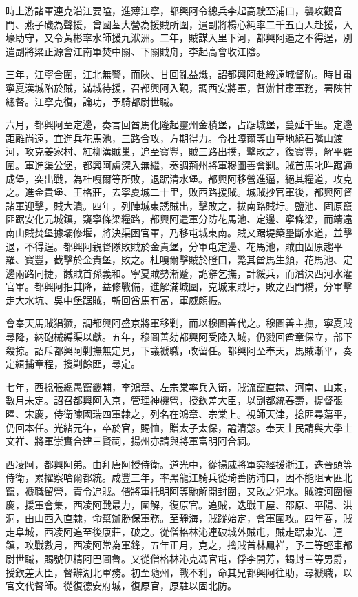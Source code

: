 \begin{pinyinscope}
時上游諸軍連克沿江要隘，進薄江寧，都興阿令總兵李起高駛至浦口，襲攻觀音門、燕子磯為聲援，曾國荃大營為援賊所圍，遣副將楊心純率二千五百人赴援，入壕助守，又令黃彬率水師援九洑洲。二年，賊謀入里下河，都興阿遏之不得逞，別遣副將梁正源會江南軍焚中關、下關賊舟，李起高會收江陰。

三年，江寧合圍，江北無警，而陜、甘回亂益熾，詔都興阿赴綏遠城督防。時甘肅寧夏漢城陷於賊，滿城待援，召都興阿入覲，調西安將軍，督辦甘肅軍務，署陜甘總督。江寧克復，論功，予騎都尉世職。

六月，都興阿至定邊，奏言回酋馬化隆起靈州金積堡，占踞城堡，蔓延千里。定邊距離尚遠，宜進兵花馬池，三路合攻，方期得力。令杜嘎爾等由草地繞石嘴山渡河，攻克姜家村、紅柳溝賊巢，追至寶豐，賊三路出撲，擊敗之，復寶豐，解平羅圍。軍進渠公堡，都興阿慮深入無繼，奏調荊州將軍穆圖善會剿。賊首馬叱吽踞通成堡，突出戰，為杜嘎爾等所敗，退踞清水堡。都興阿移營進逼，絕其糧道，攻克之。進金貴堡、王格莊，去寧夏城二十里，敗西路援賊。城賊抄官軍後，都興阿督諸軍迎擊，賊大潰。四年，列陣城東誘賊出，擊敗之，拔南路賊圩。鹽池、固原竄匪踞安化元城鎮，窺寧條梁糧路，都興阿遣軍分防花馬池、定邊、寧條梁，而靖遠南山賊焚堡據壩修堰，將決渠困官軍，乃移屯城東南。賊又踞堤築壘斷水道，並擊退，不得逞。都興阿親督隊敗賊於金貴堡，分軍屯定邊、花馬池，賊由固原趨平羅、寶豐，截擊於金貴堡，敗之。杜嘎爾擊賊於磴口，斃其酋馬生顏，花馬池、定邊兩路同捷，馘賊首孫義和。寧夏賊勢漸蹙，詭辭乞撫，計緩兵，而潛決西河水灌官軍。都興阿拒其降，益修戰備，進解滿城圍，克城東賊圩，敗之西門橋，分軍擊走大水坑、吳中堡踞賊，斬回酋馬有富，軍威頗振。

會奉天馬賊猖獗，調都興阿盛京將軍移剿，而以穆圖善代之。穆圖善主撫，寧夏賊尋降，納砲械縛渠以獻。五年，穆圖善劾都興阿受降入城，仍戮回酋章保立，部下殺掠。詔斥都興阿剿撫無定見，下議褫職，改留任。都興阿至奉天，馬賊漸平，奏定緝捕章程，搜剿餘匪，尋定。

七年，西捻張總愚竄畿輔，李鴻章、左宗棠率兵入衛，賊流竄直隸、河南、山東，數月未定。詔召都興阿入京，管理神機營，授欽差大臣，以副都統春壽，提督張曜、宋慶，侍衛陳國瑞四軍隸之，列名在鴻章、宗棠上。視師天津，捻匪尋蕩平，仍回本任。光緒元年，卒於官，賜恤，贈太子太保，謚清愨。奉天士民請與大學士文祥、將軍崇實合建三賢祠，揚州亦請與將軍富明阿合祠。

西凌阿，都興阿弟。由拜唐阿授侍衛。道光中，從揚威將軍奕經援浙江，迭晉頭等侍衛，累擢察哈爾都統。咸豐三年，率黑龍江騎兵從琦善防浦口，因不能阻★匪北竄，褫職留營，責令追賊。偕將軍托明阿等馳解開封圍，又敗之汜水。賊渡河圍懷慶，援軍會集，西凌阿戰最力，圍解，復原官。追賊，迭戰王屋、邵原、平陽、洪洞，由山西入直隸，命幫辦勝保軍務。至靜海，賊蹤始定，會軍圍攻。四年春，賊走阜城，西凌阿追至後康莊，破之。從僧格林沁連破城外賊屯，賊走踞東光、連鎮，攻戰數月，西凌阿常為軍鋒，五年正月，克之，擒賊首林鳳祥，予二等輕車都尉世職，賜號伊精阿巴圖魯。又從僧格林沁克馮官屯，俘李開芳，錫封三等男爵，授欽差大臣，督辦湖北軍務。初至隨州，戰不利，命其兄都興阿往助，尋褫職，以官文代督師。從復德安府城，復原官，原駐以固北防。


\end{pinyinscope}
